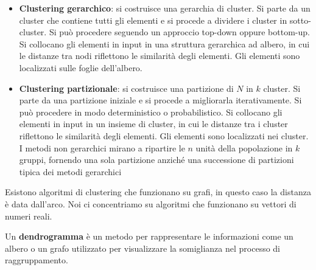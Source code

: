 \begin{itemize}
      \item \textbf{Clustering gerarchico}: si costruisce una gerarchia di cluster.
            Si parte da un cluster che contiene tutti gli elementi e si procede a
            dividere i cluster in sotto-cluster. Si può procedere seguendo un
            approccio top-down oppure bottom-up. Si collocano gli elementi in
            input in una struttura gerarchica ad albero, in cui le distanze tra
            nodi riflettono le similarità degli elementi. Gli elementi sono
            localizzati sulle foglie dell'albero.
      \item \textbf{Clustering partizionale}: si costruisce una partizione di $N$
            in $k$ cluster. Si parte da una partizione iniziale e si procede a
            migliorarla iterativamente. Si può procedere in modo deterministico
            o probabilistico. Si collocano gli elementi in input in un insieme
            di cluster, in cui le distanze tra i cluster riflettono le similarità
            degli elementi. Gli elementi sono localizzati nei cluster. I metodi
            non gerarchici mirano a ripartire le $n$ unità della popolazione in
            $k$ gruppi, fornendo una sola partizione anziché una successione di
            partizioni tipica dei metodi gerarchici
\end{itemize}
Esistono algoritmi di clustering che funzionano su grafi, in questo caso la
distanza è data dall'arco. Noi ci concentriamo su algoritmi che funzionano su
vettori di numeri reali.
\begin{definizione}
      Un \textbf{dendrogramma} è un metodo per rappresentare le informazioni come
      un albero o un grafo utilizzato per visualizzare la somiglianza nel processo
      di raggruppamento.
\end{definizione}
